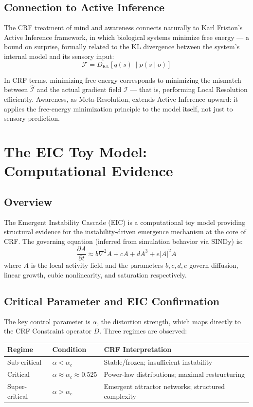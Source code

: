 \documentclass[12pt, a4paper]{article}
\begin{document}
\subsection{Connection to Active Inference}

The CRF treatment of mind and awareness connects naturally to Karl Friston's Active
Inference framework, in which biological systems minimize free energy --- a bound on
surprise, formally related to the KL divergence between the system's internal model and
its sensory input:
\[ \mathcal{F} = D_{\mathrm{KL}}[q(s) \| p(s \mid o)] \]

In CRF terms, minimizing free energy corresponds to minimizing the mismatch between
$\hat{\mathcal{I}}$ and the actual gradient field $\mathcal{I}$ --- that is, performing
Local Resolution efficiently. Awareness, as Meta-Resolution, extends Active Inference
upward: it applies the free-energy minimization principle to the model itself, not just
to sensory prediction.

\section{The EIC Toy Model: Computational Evidence}

\subsection{Overview}

The Emergent Instability Cascade (EIC) is a computational toy model providing structural
evidence for the instability-driven emergence mechanism at the core of CRF. The governing
equation (inferred from simulation behavior via SINDy) is:
\[ \frac{\partial A}{\partial t} \approx b\nabla^2 A + cA + dA^3 + e|A|^2 A \]
where $A$ is the local activity field and the parameters $b, c, d, e$ govern diffusion,
linear growth, cubic nonlinearity, and saturation respectively.

\subsection{Critical Parameter and EIC Confirmation}

The key control parameter is $\alpha$, the distortion strength, which maps directly to
the CRF Constraint operator $D$. Three regimes are observed:

\begin{center}
\renewcommand{\arraystretch}{1.2}
\begin{tabular}{lll}
\toprule
\textbf{Regime} & \textbf{Condition} & \textbf{CRF Interpretation} \\
\midrule
Sub-critical & $\alpha < \alpha_c$ & Stable/frozen; insufficient instability \\
Critical & $\alpha \approx \alpha_c \approx 0.525$ & Power-law distributions; maximal restructuring \\
Super-critical & $\alpha > \alpha_c$ & Emergent attractor networks; structured complexity \\
\bottomrule
\end{tabular}
\end{center}
\end{document}
